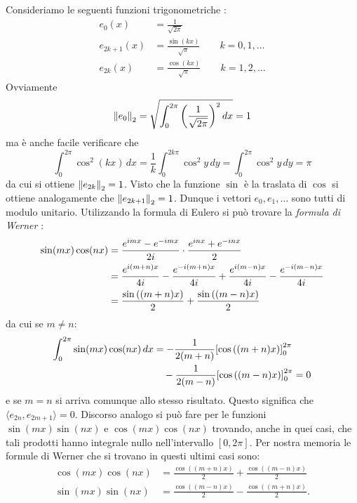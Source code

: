 Consideriamo le seguenti funzioni trigonometriche%
%
:
\begin{equation}\label{eq:54741346}
\begin{aligned}
  e_0 (x) &= \frac{1}{\sqrt{2\pi}} \\
  e_{2k+1}(x) &= \frac{\sin(kx)}{\sqrt{\pi}} \qquad k=0,1,\dots\\
  e_{2k}(x) &= \frac{\cos(kx)}{\sqrt{\pi}} \qquad k=1,2,\dots
\end{aligned}
\end{equation}
Ovviamente
\[
  {\left\Vert e_0\right\Vert}_2=\sqrt{\int_{0}^{2\pi} {\left( \frac{1}{\sqrt{2\pi}} \right)}^2\, dx} = 1
\]
ma è anche facile verificare che
\[
  \int_{0}^{2\pi} \cos^2 (kx)\, dx
  = \frac{1}{k}\int_{0}^{2k\pi} \cos^2 y\, dy
  = \int_{0}^{2\pi} \cos^2 y\, dy = \pi
\]
da cui si ottiene ${\left\Vert e_{2k}\right\Vert}_2 = 1$.
Visto che la funzione $\sin$ è la traslata di $\cos$ si
ottiene analogamente che ${\left\Vert e_{2k+1}\right\Vert}_2=1$.
Dunque i vettori $e_0,e_1,\dots$ sono tutti di modulo unitario.
Utilizzando la formula di Eulero
si può trovare la \emph{formula di Werner}%
:
%
%
\begin{align*}
 \sin(mx)\cos(nx)
 &= \frac{e^{imx}-e^{-imx}}{2i}\cdot \frac{e^{inx}+e^{-inx}}{2}\\
 &= \frac{e^{i(m+n)x}}{4i} - \frac{e^{-i(m+n)x}}{4i} 
  + \frac{e^{i(m-n)x}}{4i} - \frac{e^{-i(m-n)x}}{4i}\\
 &= \frac{\sin{\left( (m+n)x \right)}}{2} + \frac{\sin{\left( (m-n)x \right)}}{2}
\end{align*}
da cui se $m\neq n$:
\begin{align*}
 \int_{0}^{2\pi} \sin(mx)\cos(nx)\, dx &=
 -\frac 1 {2(m+n)} {\left[ \cos{\left( (m+n)x \right)} \right]}_{0}^{2\pi} \\
  &\quad - \frac{1}{2(m-n)}{\left[ \cos{\left( (m-n)x \right)} \right]}_{0}^{2\pi} = 0
\end{align*}
e se $m=n$ si arriva comunque allo stesso risultato.
Questo significa che $\langle e_{2n},e_{2m+1}\rangle = 0$.
Discorso analogo si può fare per le funzioni $\sin(mx)\sin(nx)$ e $\cos(mx)\cos(nx)$
trovando, anche in quei casi, che tali prodotti hanno integrale nullo
nell'intervallo $[0,2\pi]$.
Per nostra memoria le formule di Werner che si trovano
in questi ultimi casi sono:
%
%
%
%
\begin{align*}
  \cos(mx) \cos(nx) &=  \frac{\cos((m+n)x)}{2} + \frac{\cos((m-n)x)}{2}\\
  \sin(mx) \sin(nx) &=  \frac{\cos((m-n)x)}{2} - \frac{\cos((m+n)x)}{2}.
\end{align*}

